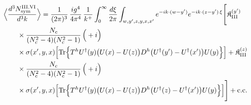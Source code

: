 \begin{align}\label{eq:S-III.VI-3}
&\Big\langle\frac{d^{3}N^{\rm III.VI}_{{\rm sym}}}{d^{3}k}\Big\rangle=\frac{1}{(2\pi)^{3}}\, \frac{ig^{4}}{4\pi^{4}}\, \frac{1}{k^{+}} \int_{0}^{\infty}\frac{d\xi}{2\pi} \int_{w,y',z,y,x,x'}e^{-ik\cdot(w-y')}e^{-ik\cdot(z-y')\,\xi}\Bigg[ \mathfrak{K}^{(y')}_{\rm III}\notag\\
&\quad\quad \times \frac{N_{c}}{(N_{c}^{2}-4)(N_{c}^{2}-1)}\, \Big(+i\Big)\notag\\
&\quad\quad \times \sigma(x',y,x)\Big[{\rm Tr}\Big\{T^{h}U^{\dagger}(y)\big(U(x)-U(z)\big)D^{h}\big(U^{\dagger}(y')-U^{\dagger}(x')\big)U(y)\Big\}\Big] + \mathfrak{K}^{(z)}_{\rm III}\notag\\
&\quad\quad \times \frac{N_{c}}{(N_{c}^{2}-4)(N_{c}^{2}-1)}\, \Big(+i\Big)\notag\\
&\quad\quad \times \sigma(x',y,x)\Big[{\rm Tr}\Big\{T^{h}U^{\dagger}(y)\big(U(x)-U(z)\big)D^{h}\big(U^{\dagger}(z)-U^{\dagger}(x')\big)U(y)\Big\}\Big]\Bigg] +{\rm c.c.}
\end{align}
